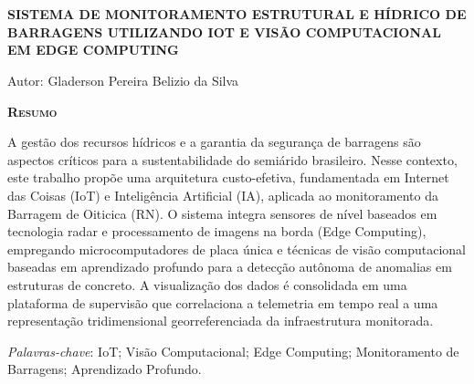 \chapter*{}
\begin{center}
    {
    \Large{
        \textbf{SISTEMA DE MONITORAMENTO ESTRUTURAL E HÍDRICO DE BARRAGENS UTILIZANDO IOT E VISÃO COMPUTACIONAL EM EDGE COMPUTING}
        }
    }
\end{center}

\vspace{1cm}

\begin{flushright}
    Autor: Gladerson Pereira Belizio da Silva\\
\end{flushright}

\vspace{1cm}

\begin{center}
    \Large{\textsc{\textbf{Resumo}}}
\end{center}

\noindent 
A gestão dos recursos hídricos e a garantia da segurança de barragens são aspectos críticos para a sustentabilidade do semiárido brasileiro. Nesse contexto, este trabalho propõe uma arquitetura custo-efetiva, fundamentada em Internet das Coisas (IoT) e Inteligência Artificial (IA), aplicada ao monitoramento da Barragem de Oiticica (RN). O sistema integra sensores de nível baseados em tecnologia radar e processamento de imagens na borda (Edge Computing), empregando microcomputadores de placa única e técnicas de visão computacional baseadas em aprendizado profundo para a detecção autônoma de anomalias em estruturas de concreto. A visualização dos dados é consolidada em uma plataforma de supervisão que correlaciona a telemetria em tempo real a uma representação tridimensional georreferenciada da infraestrutura monitorada.

\noindent\textit{Palavras-chave}: IoT; Visão Computacional; Edge Computing; Monitoramento de Barragens; Aprendizado Profundo.
